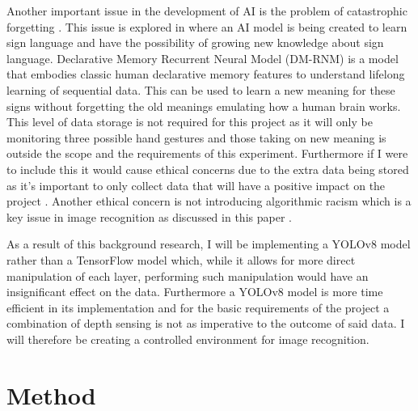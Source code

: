 \documentclass[conference]{IEEEtran}
\begin{document}
Another important issue in the development of AI is the problem of catastrophic forgetting \cite{https://doi.org/10.1111/j.1467-7687.2008.00682.x}. This issue is explored in \cite{gesture:communication:2020} where an AI model is being created to learn sign language and have the possibility of growing new knowledge about sign language. Declarative Memory Recurrent Neural Model (DM-RNM) is a model that embodies classic human declarative memory features to understand lifelong learning of sequential data. This can be used to learn a new meaning for these signs without forgetting the old meanings emulating how a human brain works. This level of data storage is not required for this project as it will only be monitoring three possible hand gestures and those taking on new meaning is outside the scope and the requirements of this experiment. Furthermore if I were to include this it would cause ethical concerns due to the extra data being stored as it's important to only collect data that will have a positive impact on the project \cite{fal}. Another ethical concern is not introducing algorithmic racism which is a key issue in image recognition as discussed in this paper \cite{algorithmic:racism}.


As a result of this background research, I will be implementing a YOLOv8 model \cite{yolo:github} rather than a TensorFlow model which, while it allows for more direct manipulation of each layer, performing such manipulation would have an insignificant effect on the data. Furthermore a YOLOv8 model is more time efficient in its implementation and for the basic requirements of the project a combination of depth sensing is not as imperative to the outcome of said data. I will therefore be creating a controlled environment for image recognition.

\section{Method}
\end{document}
